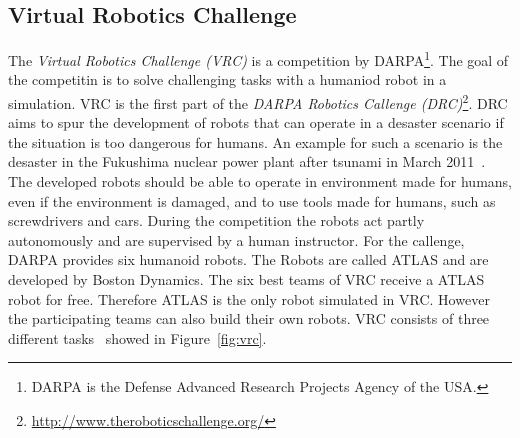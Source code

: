 \subsection{Virtual Robotics Challenge}
The \textit{Virtual Robotics Challenge (VRC)} is a competition by DARPA\footnote{DARPA is the Defense Advanced Research Projects Agency of the USA.}. The goal of the competitin is to solve challenging tasks with a humaniod robot in a simulation. VRC is the first part of the \textit{DARPA Robotics Callenge (DRC)}\footnote{\url{http://www.theroboticschallenge.org/}}. DRC aims to spur the development of robots that can operate in a desaster scenario if the situation is too dangerous for humans. An example for such a scenario is the desaster in the Fukushima nuclear power plant after tsunami in March 2011~\cite{fukushima}. The developed robots should be able to operate in environment made for humans, even if the environment is damaged, and to use tools made for humans, such as screwdrivers and cars. During the competition the robots act partly autonomously and are supervised by a human instructor. For the callenge, DARPA provides six humanoid robots. The Robots are called ATLAS and are developed by Boston Dynamics. The six best teams of VRC receive a ATLAS robot for free. Therefore ATLAS is the only robot simulated in VRC. However the participating teams can also build their own robots. VRC consists of three different tasks~\cite{vrc_rules} showed in Figure~\ref{fig:vrc}.
